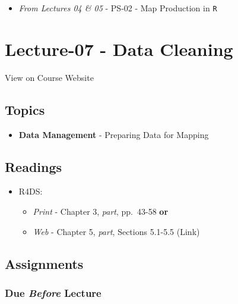 \documentclass[
]{book}
\providecommand{\tightlist}{%
  \setlength{\itemsep}{0pt}\setlength{\parskip}{0pt}}
\begin{document}
\begin{itemize}
\tightlist
\item
  \emph{From Lectures 04 \& 05} - PS-02 - Map Production in \texttt{R}
\end{itemize}

\hypertarget{lecture-07---data-cleaning}{%
\section*{Lecture-07 - Data Cleaning}\label{lecture-07---data-cleaning}}

View on Course Website

\hypertarget{topics-7}{%
\subsection*{Topics}\label{topics-7}}

\begin{itemize}
\tightlist
\item
  \textbf{Data Management} - Preparing Data for Mapping
\end{itemize}

\hypertarget{readings-8}{%
\subsection*{Readings}\label{readings-8}}

\begin{itemize}
\tightlist
\item
  R4DS:

  \begin{itemize}
  \tightlist
  \item
    \emph{Print} - Chapter 3, \emph{part}, pp.~43-58 \textbf{or}
  \item
    \emph{Web} - Chapter 5, \emph{part}, Sections 5.1-5.5 (Link)
  \end{itemize}
\end{itemize}

\hypertarget{assignments-8}{%
\subsection*{Assignments}\label{assignments-8}}

\hypertarget{due-before-lecture-6}{%
\subsubsection*{\texorpdfstring{Due \emph{Before} Lecture}{Due Before Lecture}}\label{due-before-lecture-6}}
\end{document}
